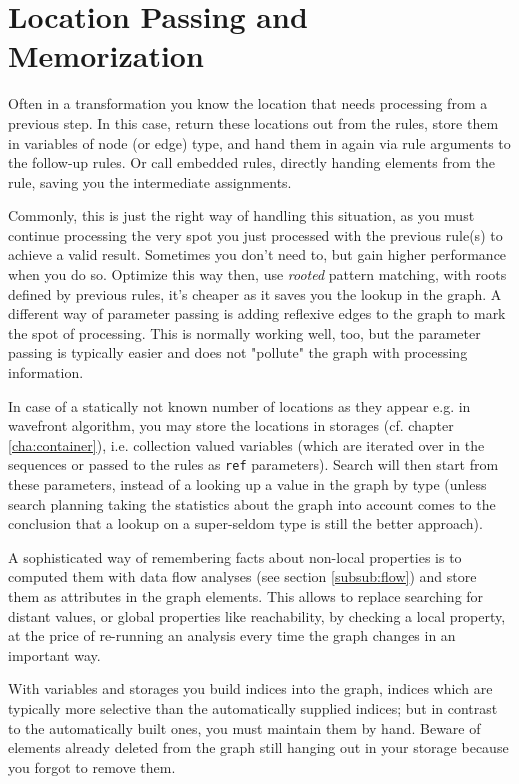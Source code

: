\section{Location Passing and Memorization}
Often in a transformation you know the location that needs processing from a previous step.
In this case, return these locations out from the rules, store them in variables of node (or edge) type, and hand them in again via rule arguments to the follow-up rules.
Or call embedded rules, directly handing elements from the rule, saving you the intermediate assignments.

Commonly, this is just the right way of handling this situation, 
as you must continue processing the very spot you just processed with the previous rule(s) to achieve a valid result.
Sometimes you don't need to, but gain higher performance when you do so.
Optimize this way then, use \emph{rooted} pattern matching, with roots defined by previous rules, it's cheaper as it saves you the lookup in the graph.
A different way of parameter passing is adding reflexive edges to the graph to mark the spot of processing.
This is normally working well, too, but the parameter passing is typically easier and does not "pollute" the graph with processing information.

In case of a statically not known number of locations as they appear e.g. in wavefront algorithm, you may store the locations in storages (cf. chapter \ref{cha:container}), i.e. collection valued variables (which are iterated over in the sequences or passed to the rules as \texttt{ref} parameters).
Search will then start from these parameters, instead of a looking up a value in the graph by type (unless search planning taking the statistics about the graph into account comes to the conclusion that a lookup on a super-seldom type is still the better approach).

A sophisticated way of remembering facts about non-local properties is to computed them with data flow analyses (see section \ref{subsub:flow}) and store them as attributes in the graph elements.
This allows to replace searching for distant values, or global properties like reachability, by checking a local property, at the price of re-running an analysis every time the graph changes in an important way.

With variables and storages you build indices into the graph, indices which are typically more selective than the automatically supplied indices; 
but in contrast to the automatically built ones, you must maintain them by hand.
Beware of elements already deleted from the graph still hanging out in your storage because you forgot to remove them.

